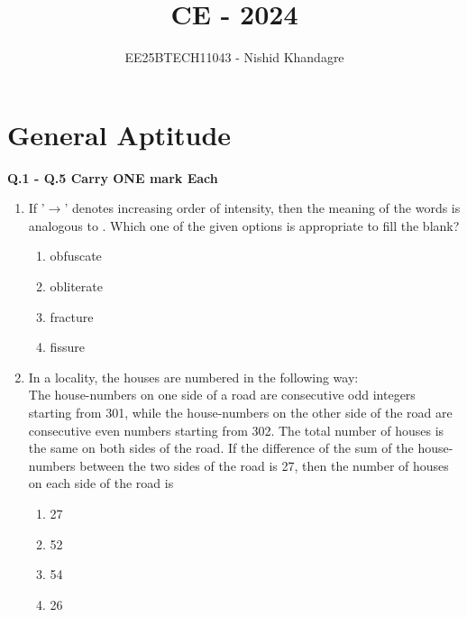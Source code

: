 \documentclass[journal,12pt,onecolumn]{article}
\theoremstyle{remark}
\begin{document}
\title{CE - 2024}
\author{EE25BTECH11043 - Nishid Khandagre}
\date{}
\maketitle

\renewcommand{\thefigure}{\theenumi}
\renewcommand{\thetable}{\theenumi}

\section*{General Aptitude }
\textbf{Q.1 - Q.5 Carry ONE mark Each}

\begin{enumerate}
    \item If '$\rightarrow$' denotes increasing order of intensity, then the meaning of the words
     is analogous to .
    Which one of the given options is appropriate to fill the blank?

    \hfill{}
    \begin{enumerate}
        \item obfuscate
        \item obliterate
        \item fracture
        \item fissure
    \end{enumerate}

    \item In a locality, the houses are numbered in the following way:\\
    The house-numbers on one side of a road are consecutive odd integers starting from 301, while the house-numbers on the other side of the road are consecutive even numbers starting from 302. The total number of houses is the same on both sides of the road.
    If the difference of the sum of the house-numbers between the two sides of the road is 27, then the number of houses on each side of the road is

    \hfill{}
    \begin{enumerate}
        \item 27
        \item 52
        \item 54
        \item 26
    \end{enumerate}
    

\end{enumerate}
\end{document}
